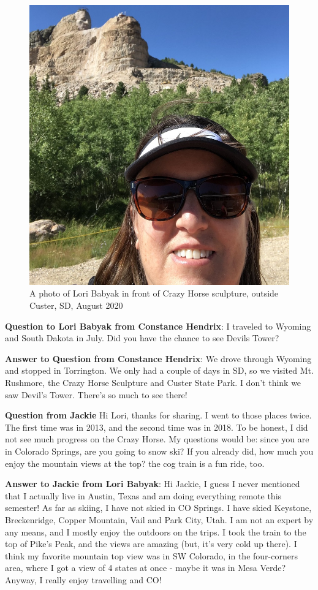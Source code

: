 \begin{figure} [h!]
    \centering
    \includegraphics[width=.4\textwidth]{LoriSDSmall.JPG} 
    \caption{A photo of Lori Babyak in front of Crazy Horse sculpture, outside Custer, SD, August 2020}
\end{figure}


\textbf{Question  to Lori Babyak from Constance Hendrix}:  I traveled to Wyoming and South Dakota in July.  Did you have the chance to see Devils Tower?

\textbf{Answer to Question from Constance Hendrix}: We drove through Wyoming and stopped in Torrington.  We only had a couple of days in SD, so we visited Mt. Rushmore, the Crazy Horse Sculpture and Custer State Park.  I don't think we saw Devil's Tower. There's so much to see there!

\textbf{Question from Jackie}
Hi Lori, thanks for sharing. I went to those places twice. The first time was in 2013, and the second time was in 2018. To be honest, I did not see much progress on the Crazy Horse. My questions would be: since you are in Colorado Springs, are you going to snow ski? If you already did, how much you enjoy the mountain views at the top? the cog train is a fun ride, too. 

\textbf{Answer to Jackie from Lori Babyak}: Hi Jackie, I guess I never mentioned that I actually live in Austin, Texas and am doing everything remote this semester! As far as skiing, I have not skied in CO Springs.  I have skied Keystone, Breckenridge, Copper Mountain, Vail and Park City, Utah. I am not an expert by any means, and I mostly enjoy the outdoors on the trips. I took the train to the top of Pike's Peak, and the views are amazing (but, it's very cold up there).  I think my favorite mountain top view was in SW Colorado, in the four-corners area, where I got a view of 4 states at once - maybe it was in Mesa Verde? Anyway, I really enjoy travelling and CO!

